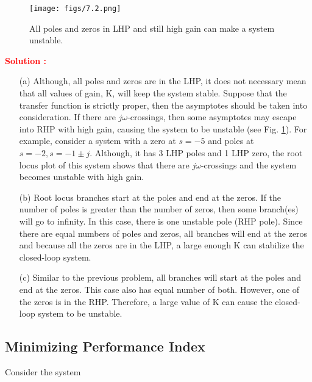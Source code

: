 \documentclass[12pt]{article}
\begin{document}
\begin{figure}[h!]
    \centering
    \texttt{[image: figs/7.2.png]}
    \caption{All poles and zeros in LHP and still high gain can make a system unstable.}
    \label{fig:prb_6}
\end{figure}
\textbf{\textcolor{red}{Solution :}} 
\begin{itemize}
    \item [(a)] Although, all poles and zeros are in the LHP, it does not necessary mean that all values of gain, K, will keep the system stable. Suppose that the transfer function is strictly proper, then the asymptotes should be taken into consideration. If there are $j \omega$-crossings, then some asymptotes may escape into RHP with high gain, causing the system to be unstable (see Fig. \ref{fig:prb_6}). For example, consider a system with a zero at $s =-5$ and poles at $s =-2, s =-1 \pm j$. Although, it has 3 LHP poles and 1 LHP zero, the root locus plot of this system shows that there are $j \omega$-crossings and the system becomes unstable with high gain.
    \item[(b)]  Root locus branches start at the poles and end at the zeros. If the number of poles is greater than the number of zeros, then some branch(es) will go to infinity. In this case, there is one unstable pole (RHP pole). Since there are equal numbers of poles and zeros, all branches will end at the zeros and because all the zeros are in the LHP, a large enough K can stabilize the closed-loop system.
    \item[(c)] Similar to the previous problem, all branches will start at the poles and end at the zeros. This case also has equal number of both. However, one of the zeros is in the RHP. Therefore, a large value of K can cause the closed-loop system to be unstable. 
\end{itemize}
\clearpage

\subsection{Minimizing Performance Index}

Consider the system
\end{document}
